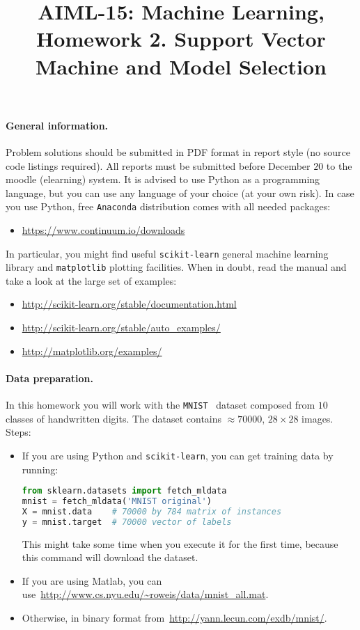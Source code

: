 \documentclass{article}
\title{AIML-15: Machine Learning, Homework 2. Support Vector Machine and Model Selection}
\begin{document}
\maketitle

\paragraph{General information.} Problem solutions should be submitted in PDF format in report style (no source code listings required).
All reports must be submitted before December $20$ to the moodle (elearning) system.
It is advised to use Python as a programming language, but you can use any language of your choice (at your own risk).
In case you use Python, free \verb!Anaconda! distribution comes with all needed packages:
\begin{itemize}
\item[] \url{https://www.continuum.io/downloads}
\end{itemize}
In particular, you might find useful \verb!scikit-learn! general machine learning library and \verb!matplotlib! plotting facilities. When in doubt, read the manual and take a look at the large set of examples:
\begin{itemize}
\item[] \url{http://scikit-learn.org/stable/documentation.html}
\item[] \url{http://scikit-learn.org/stable/auto_examples/}
\item[] \url{http://matplotlib.org/examples/}
\end{itemize}

\paragraph{Data preparation.} In this homework you will work with the \verb!MNIST!~\cite{lecun1998mnist} dataset composed from $10$ classes of handwritten digits.
The dataset contains $\approx 70000$, $28\times 28$ images. Steps:
\begin{itemize}
\item If you are using Python and \verb!scikit-learn!, you can get training data by running:
\begin{lstlisting}[language=Python]
from sklearn.datasets import fetch_mldata
mnist = fetch_mldata('MNIST original')
X = mnist.data    # 70000 by 784 matrix of instances
y = mnist.target  # 70000 vector of labels
\end{lstlisting}
This might take some time  when you execute it for the first time, because this command will download the dataset.
\item If you are using Matlab, you can use~\url{http://www.cs.nyu.edu/~roweis/data/mnist_all.mat}.
\item Otherwise, in binary format from~\url{http://yann.lecun.com/exdb/mnist/}.
\end{itemize}
\end{document}
